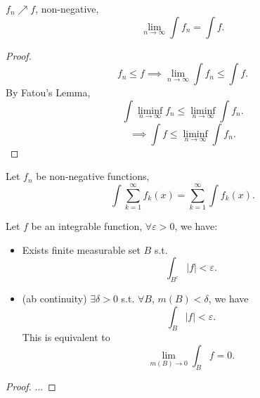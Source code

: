 \begin{theorem}
    $f_n \nearrow f$, non-negative,
	 \[
	\lim_{n\to \infty}\int f_n = \int f
	.\]
\end{theorem}
\begin{proof}[Proof]
    \[
    f_n\le f\implies \lim_{n \to \infty}\int f_n \le \int f
    .\]
    By Fatou's Lemma,
	\[
	\int \liminf_{n\to \infty} f_n \le \liminf_{n\to \infty}\int f_n
	.\]
	\[
		\implies \int f \le \liminf_{n\to \infty} \int f_n
	.\]
\end{proof}
\begin{corollary}
    Let $f_n$ be non-negative functions,
	\[
	\int \sum_{k=1}^{\infty} f_k(x) = \sum_{k=1}^{\infty} \int f_k(x)
	.\]
\end{corollary}

\begin{proposition}
    Let $f$ be an integrable function, $\forall\varepsilon>0$, we have:
	 \begin{itemize}
		\item Exists finite measurable set $B$ s.t.
			\[
				\int_{B^c}|f|<\varepsilon
			.\]
	    \item (ab continuity) $\exists\delta>0$ s.t.
			$\forall B$, $m(B)<\delta$, we have
			 \[
			 \int_B |f| < \varepsilon
			.\]
			This is equivalent to
			\[
				\lim_{m(B)\to 0}\int_B f = 0
			.\]
	\end{itemize}
\end{proposition}
\begin{proof}[Proof]
    ...
\end{proof}
